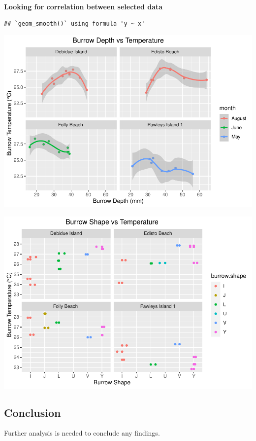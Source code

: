 \documentclass[
]{article}
\begin{document}
\textbf{Looking for correlation between selected data}

\begin{verbatim}
## `geom_smooth()` using formula 'y ~ x'
\end{verbatim}

\includegraphics{Crab_Analysis_files/figure-latex/unnamed-chunk-5-1.pdf}

\includegraphics{Crab_Analysis_files/figure-latex/unnamed-chunk-6-1.pdf}

\hypertarget{conclusion}{%
\subsection{Conclusion}\label{conclusion}}

Further analysis is needed to conclude any findings.
\end{document}
